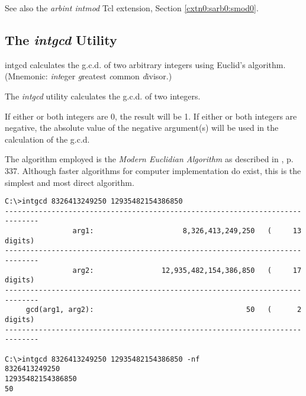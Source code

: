 \begin{dosutilcommandseealso}
See also the \emph{arbint intmod} Tcl extension, 
Section \cxtnzeroxrefhyphen{}\ref{cxtn0:sarb0:smod0}.
\end{dosutilcommandseealso}


\subsection{The \emph{intgcd} Utility}
\label{cdcm0:sali0:sgcd0}

\begin{dosutilcommandname}{intgcd}%
calculates the g.c.d. of two arbitrary integers using
Euclid's algorithm.  (Mnemonic:  \emph{int}eger
\emph{g}reatest \emph{c}ommon \emph{d}ivisor.)
\end{dosutilcommandname}

\begin{dosutilcommandsynopsis}
\end{dosutilcommandsynopsis}

\begin{dosutilcommanddescription}
The \emph{intgcd} utility calculates the g.c.d. of two
integers.

If either or both integers are 0, the result will be 1.
If either or both integers are negative, the absolute 
value of the negative argument(s) will be used in the
calculation of the g.c.d.

The algorithm employed is the
\emph{Modern Euclidian Algorithm} as
described in \cite{bibref:b:knuthclassic2ndedvol2}, p. 337.
Although faster algorithms for computer
implementation do exist, this is the simplest
and most direct algorithm.
\end{dosutilcommanddescription}

\begin{dosutilcommandsampleinvocations}
\begin{scriptsize}
\begin{verbatim}
C:\>intgcd 8326413249250 12935482154386850
------------------------------------------------------------------------------
                arg1:                     8,326,413,249,250   (     13 digits)
------------------------------------------------------------------------------
                arg2:                12,935,482,154,386,850   (     17 digits)
------------------------------------------------------------------------------
     gcd(arg1, arg2):                                    50   (      2 digits)
------------------------------------------------------------------------------

C:\>intgcd 8326413249250 12935482154386850 -nf
8326413249250
12935482154386850
50
\end{verbatim}
\end{scriptsize}
\end{dosutilcommandsampleinvocations}

